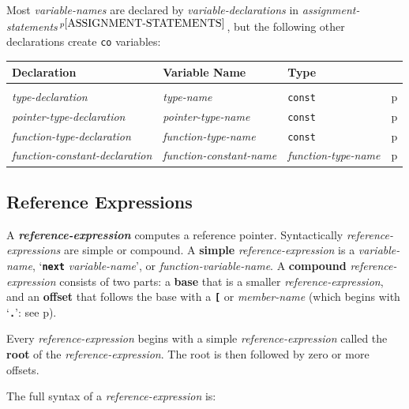 \documentclass[12pt]{article}
\newcommand{\TT}[1]{{\tt \bfseries #1}}
\newcommand{\key}[1]{{\rm \bfseries #1}}
\newcommand{\emkey}[1]{{\em \bfseries #1}}
\newcommand{\pagref}[1]{p\pageref{#1}}
\newcommand{\pagnote}[1]{$\,^{p\pageref{#1}}$}
\begin{document}
Most {\em variable-names} are declared by {\em variable-declarations}
in {\em assignment-statements}\pagnote{ASSIGNMENT-STATEMENTS}, but
the following other declarations create {\tt co} variables:
\begin{center}
\begin{tabular}{l@{~~~~}l@{~~~~}l@{~~~~}l}
\bf Declaration & \bf Variable Name & \bf Type &
\\\hline
\\[1ex]
{\em type-declaration} & {\em type-name} & {\tt const} & \pagref{TYPE-DECLARATIONS} \\
{\em pointer-type-declaration} & {\em pointer-type-name} & {\tt const}
                               & \pagref{POINTER-TYPE-DECLARATIONS} \\
{\em function-type-declaration} & {\em function-type-name} & {\tt const}
                               & \pagref{FUNCTION-TYPE-DECLARATIONS} \\
{\em function-constant-declaration} & {\em function-constant-name}
			       & {\em function-type-name}
                               & \pagref{FUNCTION-CONSTANT-DECLARATION} \\
\end{tabular}
\end{center}

\subsection{Reference Expressions}
\label{REFERENCE-EXPRESSIONS}

A \emkey{reference-expression} computes a reference pointer.
Syntactically {\em reference-expressions} are simple or compound.
A \key{simple} {\em reference-expression} is
a {\em variable-name}, `\TT{next} {\em variable-name}', or
{\em function-variable-name}.
A \key{compound} {\em refer\-ence-expression} consists of two parts:
a \key{base} that is a smaller {\em reference-expression},
and an \key{offset} that follows the base with
a \TT{[} or {\em member-name}
(which begins with `\TT{.}': see \pagref{MEMBER-NAME}).

Every {\em reference-expression} begins with a simple
{\em reference-expression} called the \key{root} of the
{\em reference-expression}.  The root is then followed by zero or more
offsets.

The full syntax of a {\em reference-expression} is:
\end{document}

